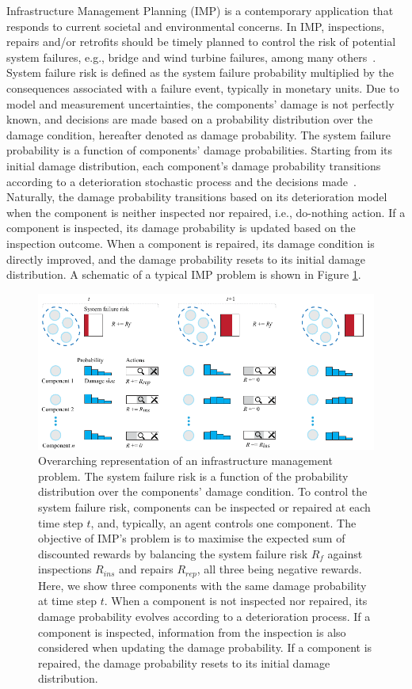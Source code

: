 Infrastructure Management Planning (IMP) is a contemporary application that responds to current societal and environmental concerns.
In IMP, inspections, repairs and/or retrofits should be timely planned to control the risk of potential system failures, e.g., bridge and wind turbine failures, among many others~\citep{morato2022optimal}.
System failure risk is defined as the system failure probability multiplied by the consequences associated with a failure event, typically in monetary units.
Due to model and measurement uncertainties, the components' damage is not perfectly known, and decisions are made based on a probability distribution over the damage condition, hereafter denoted as damage probability.
The system failure probability is a function of components' damage probabilities.
Starting from its initial damage distribution, each component's damage probability transitions according to a deterioration stochastic process and the decisions made~\citep{morato2022optimal}.
Naturally, the damage probability transitions based on its deterioration model when the component is neither inspected nor repaired, i.e., do-nothing action.
If a component is inspected, its damage probability is updated based on the inspection outcome.
When a component is repaired, its damage condition is directly improved, and the damage probability resets to its initial damage distribution.
A schematic of a typical IMP problem is shown in Figure \ref{fig:ch5_imp_problem}.

\begin{figure}
\centering
\includegraphics[width=\textwidth]{tex_thesis/figures/ch5/imp_intro.pdf}
\caption{Overarching representation of an infrastructure management problem.
The system failure risk is a function of the probability distribution over the components' damage condition. 
To control the system failure risk, components can be inspected or repaired at each time step $t$, and, typically, an agent controls one component.
The objective of IMP's problem is to maximise the expected sum of discounted rewards by balancing the system failure risk $R_f$ against inspections $R_{ins}$ and repairs $R_{rep}$, all three being negative rewards.
Here, we show three components with the same damage probability at time step $t$.
When a component is not inspected nor repaired, its damage probability evolves according to a deterioration process.
If a component is inspected, information from the inspection is also considered when updating the damage probability.
If a component is repaired, the damage probability resets to its initial damage distribution.}
\label{fig:ch5_imp_problem}
\end{figure}

